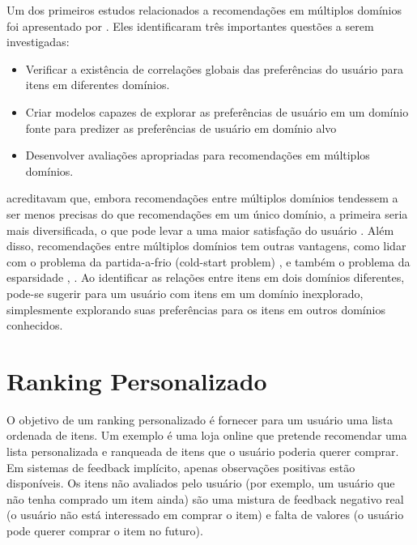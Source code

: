 Um dos primeiros estudos relacionados a recomendações em múltiplos domínios foi apresentado por \citep{Winoto2008}. Eles identificaram três importantes questões a serem investigadas:

\begin{itemize}
	\item{Verificar a existência de correlações globais das preferências do usuário para itens em diferentes domínios.}
	
	\item{Criar modelos capazes de explorar as preferências de usuário em um domínio fonte para predizer as preferências de usuário em domínio alvo}
	
	\item{Desenvolver avaliações apropriadas para recomendações em múltiplos domínios.}
\end{itemize}

\cite{Winoto2008} acreditavam que, embora recomendações entre múltiplos domínios tendessem a ser menos precisas do que recomendações em um único domínio, a primeira seria mais diversificada, o que pode levar a uma maior satisfação do usuário \citep{Adomavicius:2005:TNG:1070611.1070751}. Além disso, recomendações entre múltiplos domínios tem outras vantagens, como lidar com o problema da partida-a-frio (cold-start problem) \citep{Abel2012}, e também o problema da esparsidade \citep{Li:2009:MBC:1661445.1661773}, \citep{AAAI101649}. Ao identificar as relações entre itens em dois domínios diferentes, pode-se sugerir para um usuário com itens em um domínio inexplorado, simplesmente explorando suas preferências para os itens em outros domínios conhecidos.





\section{Ranking Personalizado}
O objetivo de um ranking personalizado é fornecer para um usuário uma lista ordenada de itens. Um exemplo é uma loja online que pretende recomendar uma lista personalizada e ranqueada de itens que o usuário poderia querer comprar. Em sistemas de feedback implícito, apenas observações positivas estão disponíveis.  Os itens não avaliados pelo usuário (por exemplo, um usuário que não tenha comprado um item ainda) são uma mistura de feedback negativo real (o usuário não está interessado em comprar o item) e falta de valores (o usuário pode querer comprar o item no futuro).



